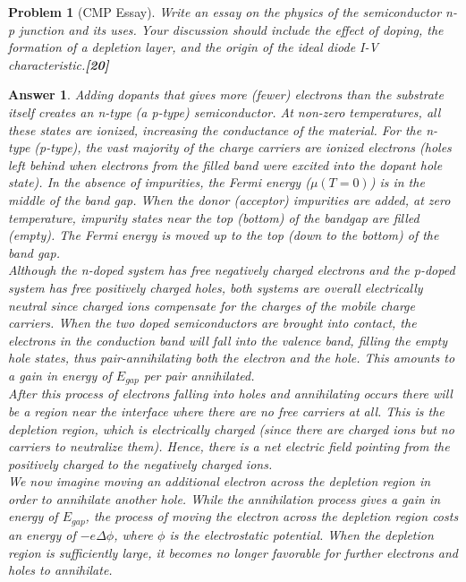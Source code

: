 \documentclass[a4paper]{article}
\newtheorem{ans}{Answer}[subsection]
\theoremstyle{new}
\newtheorem{qns}{Problem}[subsection]
\begin{document}
\newpage
\begin{qns}[CMP Essay]
Write an essay on the physics of the semiconductor n-p junction and its uses. Your discussion should include the effect of doping, the formation of a depletion layer, and the origin of the ideal diode I-V characteristic.\hfill\textbf{[20]}
\end{qns}
\begin{ans}
Adding dopants that gives more (fewer) electrons than the substrate itself creates an n-type (a p-type) semiconductor. At non-zero temperatures, all these states are ionized, increasing the conductance of the material. For the n-type (p-type), the vast majority of the charge carriers are ionized electrons (holes left behind when electrons from the filled band were excited into the dopant hole state). In the absence of impurities, the Fermi energy ($\mu(T=0)$) is in the middle of the band gap. When the donor (acceptor) impurities are added, at zero temperature, impurity states near the top (bottom) of the bandgap are filled (empty). The Fermi energy is moved up to the top (down to the bottom) of the band gap.\\[5pt]
Although the n-doped system has free negatively charged electrons and the p-doped system has free positively charged holes, both systems are overall electrically neutral since charged ions compensate for the charges of the mobile charge carriers. When the two doped semiconductors are brought into contact, the electrons in the conduction band will fall into the valence band, filling the empty hole states, thus pair-annihilating both the electron and the hole. This amounts to a gain in energy of $E_{gap}$ per pair annihilated.\\[5pt]
After this process of electrons falling into holes and annihilating occurs there will be a region near the interface where there are no free carriers at all. This is the depletion region, which is electrically charged (since there are charged ions but no carriers to neutralize them). Hence, there is a net electric field pointing from the positively charged to the negatively charged ions.\\[5pt]
We now imagine moving an additional electron across the depletion region in order to annihilate another hole. While the annihilation process gives a gain in energy of $E_{gap}$, the process of moving the electron across the depletion region costs an energy of $-e\Delta\phi$, where $\phi$ is the electrostatic potential. When the depletion region is sufficiently large, it becomes no longer favorable for further electrons and holes to annihilate. \\[5pt]

\end{ans}
\end{document}
